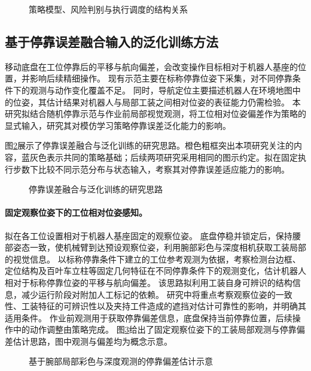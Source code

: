 \begin{figure}[htbp]
  \centering
  
  \caption{策略模型、风险判别与执行调度的结构关系}
  \label{fig:policy-risk-architecture}
\end{figure}

\subsection{基于停靠误差融合输入的泛化训练方法}
\label{subsec:improvement-one}

移动底盘在工位停靠后的平移与航向偏差，会改变操作目标相对于机器人基座的位置，并影响后续精细操作。
现有示范主要在标称停靠位姿下采集，对不同停靠条件下的观测与动作变化覆盖不足。
同时，导航定位主要描述机器人在环境地图中的位姿，其估计结果对机器人与局部工装之间相对位姿的表征能力仍需检验。
本研究拟结合随机停靠示范与作业前局部视觉观测，将工位相对位姿偏差作为策略的显式输入，研究其对模仿学习策略停靠误差泛化能力的影响。

图\ref{fig:policy-error-fusion-delta}展示了停靠误差融合与泛化训练的研究思路。橙色粗框突出本项研究关注的内容，蓝灰色表示共同的策略基础；后续两项研究采用相同的图示约定。拟在固定执行步数下比较不同示范分布与状态输入，考察其对停靠误差适应能力的影响。

\begin{figure}[htbp]
  \centering
  
  \caption{停靠误差融合与泛化训练的研究思路}
  \label{fig:policy-error-fusion-delta}
\end{figure}

\paragraph{固定观察位姿下的工位相对位姿感知。}
拟在各工位设置相对于机器人基座固定的观察位姿。
底盘停稳并锁定后，保持腰部姿态一致，使机械臂到达预设观察位姿，利用腕部彩色与深度相机获取工装局部的视觉信息。
以标称停靠条件下建立的工位参考观测为依据，考察检测台边框、定位结构及百叶车立柱等固定几何特征在不同停靠条件下的观测变化，估计机器人相对于标称停靠位姿的平移与航向偏差。
该思路拟利用工装自身可辨识的结构信息，减少运行阶段对附加人工标记的依赖。
研究中将重点考察观察位姿的一致性、工装特征的可辨识性以及夹持工件造成的遮挡对估计可靠性的影响，并明确其适用条件。
作业前观测用于获取停靠偏差信息，底盘保持当前停靠位置，后续操作中的动作调整由策略完成。
图\ref{fig:wrist-visual-docking-estimation}给出了固定观察位姿下的工装局部观测与停靠偏差估计思路，图中观测与偏差均为概念示意。

\begin{figure}[htbp]
  \centering
  
  \caption{基于腕部局部彩色与深度观测的停靠偏差估计示意}
  \label{fig:wrist-visual-docking-estimation}
\end{figure}

